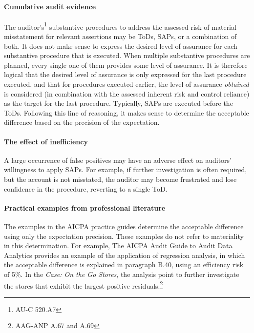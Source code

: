 \paragraph{Cumulative audit evidence}The auditor's\footnote{AU-C 520.A7} substantive procedures to address the assessed risk of material misstatement for relevant assertions may be ToDs, SAPs, or a combination of both. It does not make sense to express the desired level of assurance for each substantive procedure that is executed. When multiple substantive procedures are planned, every single one of them provides some level of assurance. It is therefore logical that the desired level of assurance is only expressed for the last procedure executed, and that for procedures executed earlier, the level of assurance \emph{obtained} is considered (in combination with the assessed inherent risk and control reliance) as the target for the last procedure. Typically, SAPs are executed before the ToDs. Following this line of reasoning, it makes sense to determine the acceptable difference based on the precision of the expectation.

\paragraph{The effect of inefficiency} A large occurrence of false positives may have an adverse effect on auditors' willingness to apply SAPs. For example, if further investigation is often required, but the account is not misstated, the auditor may become frustrated and lose confidence in the procedure, reverting to a single ToD.

\paragraph{Practical examples from professional literature} The examples in the AICPA practice guides determine the acceptable difference using only the expectation precision. These examples do not refer to materiality in this determination. For example, The AICPA Audit Guide to Audit Data Analytics provides an example of the application of regression analysis, in which the acceptable difference is explained in paragraph B.40, using an efficiency risk of 5\%. In the \textit{Case: On the Go Stores}, the analysis point to further investigate the stores that exhibit the largest positive residuals.\footnote{AAG-ANP A.67 and A.69} 

